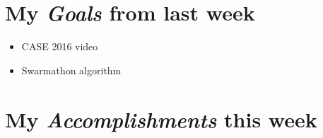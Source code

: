 \newcommand{\handoutName}{Weekly report}
\newcommand{\handoutdate}{\today}
\newcommand{\duedate}{}



\section{My \emph{Goals} from last week}
\begin{itemize}
\item CASE 2016 video
\item Swarmathon algorithm



\end{itemize}

\section{My \emph{Accomplishments} this week}


